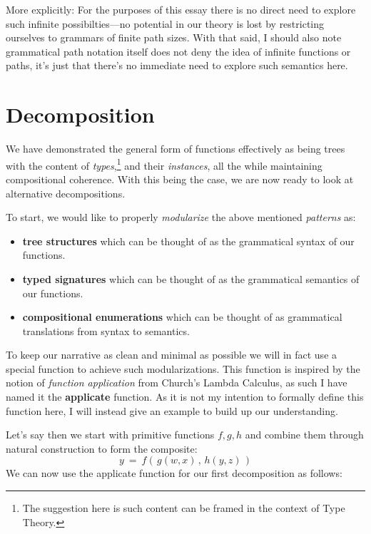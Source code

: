 \documentclass[twoside]{article}
\newcommand{\strong}[1]{{\bfseries #1}}
\begin{document}
More explicitly: For the purposes of this essay there is no direct need to explore such infinite possibilties---no
potential in our theory is lost by restricting ourselves to grammars of finite path sizes. With that said, I should
also note grammatical path notation itself does not deny the idea of infinite functions or paths, it's just that
there's no immediate need to explore such semantics here.

\section*{Decomposition}

We have demonstrated the general form of functions effectively as being trees with the content of
\emph{types},\footnote{The suggestion here is such content can be framed in the context of Type Theory.}
and their \emph{instances}, all the while maintaining compositional coherence. With this being the case,
we are now ready to look at alternative decompositions.

To start, we would like to properly \emph{modularize} the above mentioned \emph{patterns} as:
\begin{itemize}
\item \strong{tree structures} which can be thought of as the grammatical syntax of our functions.
\item \strong{typed signatures} which can be thought of as the grammatical semantics of our functions.
\item \strong{compositional enumerations} which can be thought of as grammatical translations from syntax to semantics.
\end{itemize}
To keep our narrative as clean and minimal as possible we will in fact use a special function to achieve such
modularizations. This function is inspired by the notion of \emph{function application} from Church's Lambda Calculus,
as such I have named it the \strong{applicate} function. As it is not my intention to formally define this function here,
I will instead give an example to build up our understanding.

Let's say then we start with primitive functions $ f, g, h $ and combine
them through natural construction to form the composite:
$$ y\ =\ f(\,g(w,x)\,,\,h(y,z)\,) $$
We can now use the applicate function for our first decomposition as follows:
\end{document}
